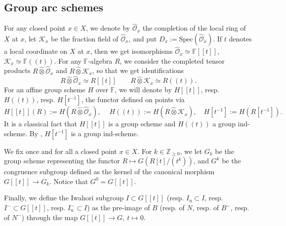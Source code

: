 \documentclass[11pt]{amsart}
\theoremstyle{plain}
\theoremstyle{remark}
\numberwithin{equation}{section}
\begin{document}
	\subsection{Group arc schemes}\label{section Group arc schemes}
	For any closed point $x\in X$, we denote by $\hat{\mathcal{O}}_{x}$ the completion of the local ring of $X$ at $x$, let $\mathcal{K}_{x}$ be the fraction field of $\hat{\mathcal{O}}_{x}$, and put $D_x:=\mathrm{Spec}(\hat{\mathcal{O}}_{x})$. If $t$ denotes a local coordinate on $X$ at $x$, then we get isomorphisms  $\hat{\mathcal{O}}_{x}\simeq\mathbb{F}[[t]]$, $\mathcal{K}_{x}\simeq\mathbb{F}((t))$. For any $\mathbb{F}$-algebra $R$, we consider the completed tensor products $R\hat{\otimes}\hat{\mathcal{O}}_{x}$ and $R\hat{\otimes}\mathcal{K}_{x}$, so that we get identifications
	$$R\hat{\otimes}\hat{\mathcal{O}}_{x}\simeq R[[t]]\qquad  R\hat{\otimes}\mathcal{K}_{x}\simeq R((t)).$$
	For an affine group scheme $H$ over $\mathbb{F}$, we will denote by $H[[t]]$, resp. $H((t))$, resp. $H[t^{-1}]$, the functor defined on points via
	$$H[[t]](R):=H(R\hat{\otimes}\hat{\mathcal{O}}_{x}),\quad~H((t)):=H(R\hat{\otimes}\mathcal{K}_{x}),\quad H[t^{-1}]:=H(R[t^{-1}]). $$
	It is a classical fact that $H[[t]]$ is a group scheme and $H((t))$ a group ind-scheme. By \cite[§2.3]{zhu2016introduction}, $H[t^{-1}]$ is a group ind-scheme.
	
	We fix once and for all a closed point $x\in X$. For $k\in\mathbb{Z}_{\geq 0}$, we let $G_k$ be the group scheme representing the functor $R\mapsto G(R[t]/(t^k))$, and $G^k$ be the congruence subgroup defined as the kernel of the canonical morphism $G[[t]]\to G_k$. Notice that $G^0=G[[t]]$.
	
	Finally, we define the Iwahori subgroup $I\subset G[[t]]$ (resp. $I_\mathrm{u}\subset I$, resp. $I^-\subset G[[t]]$, resp. $I_\mathrm{u}^-\subset I$) as the pre-image of $B$ (resp. of $N$, resp. of $B^-$, resp. of $N^-$) through the map $G[[t]]\to G,~t\mapsto0$.
\end{document}
